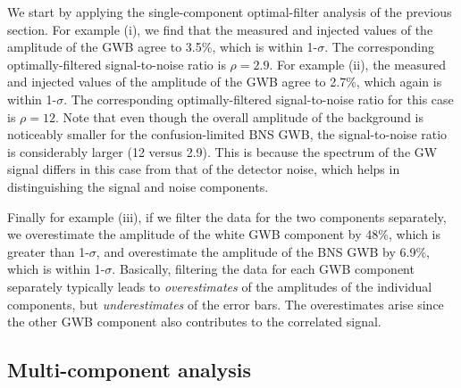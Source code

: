 \documentclass[11pt]{article}
\numberwithin{equation}{section}
\begin{document}
We start by applying the single-component optimal-filter
analysis of the previous section.
For example (i), we find that the measured and injected
values of the amplitude of the GWB agree to 3.5\%, 
which is within 1-$\sigma$.
The corresponding optimally-filtered signal-to-noise
ratio is $\rho=2.9$.
For example (ii), the measured and injected values of
the amplitude of the GWB agree to 2.7\%, which again 
is within 1-$\sigma$.
The corresponding optimally-filtered signal-to-noise
ratio for this case is $\rho=12$.
Note that even though the overall amplitude of the
background is noticeably smaller for the confusion-limited
BNS GWB, the signal-to-noise ratio is considerably
larger (12 versus 2.9).
This is because the spectrum of the GW signal differs 
in this case from that of the detector noise,
which helps in distinguishing the signal and noise components.

Finally for example (iii), if we filter the data for 
the two components separately, 
we overestimate the amplitude of the white GWB component 
by 48\%, which is greater than 1-$\sigma$, and overestimate
the amplitude of the BNS GWB by 6.9\%, which is within 1-$\sigma$.
Basically, filtering the data for each GWB component 
separately typically leads to {\em overestimates}
of the amplitudes of the individual components, 
but {\em underestimates} of the error bars.
The overestimates arise since the other GWB component
also contributes to the correlated signal.

\subsection{Multi-component analysis}
\end{document}

